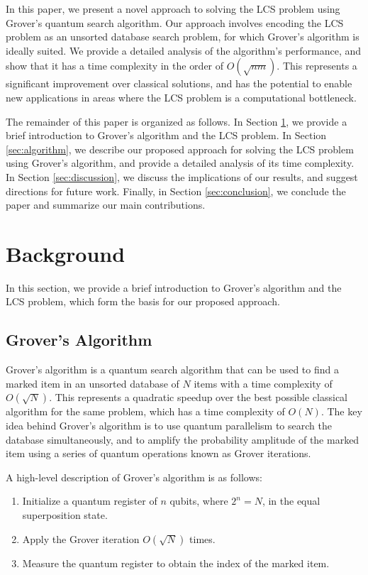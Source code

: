 In this paper, we present a novel approach to solving the LCS problem using Grover's quantum search algorithm. Our approach involves encoding the LCS problem as an unsorted database search problem, for which Grover's algorithm is ideally suited. We provide a detailed analysis of the algorithm's performance, and show that it has a time complexity in the order of $O(\sqrt{nm})$. This represents a significant improvement over classical solutions, and has the potential to enable new applications in areas where the LCS problem is a computational bottleneck.

The remainder of this paper is organized as follows. In Section \ref{sec:background}, we provide a brief introduction to Grover's algorithm and the LCS problem. In Section \ref{sec:algorithm}, we describe our proposed approach for solving the LCS problem using Grover's algorithm, and provide a detailed analysis of its time complexity. In Section \ref{sec:discussion}, we discuss the implications of our results, and suggest directions for future work. Finally, in Section \ref{sec:conclusion}, we conclude the paper and summarize our main contributions.

\section{Background}
\label{sec:background}

In this section, we provide a brief introduction to Grover's algorithm and the LCS problem, which form the basis for our proposed approach.

\subsection{Grover's Algorithm}

Grover's algorithm \cite{grover} is a quantum search algorithm that can be used to find a marked item in an unsorted database of $N$ items with a time complexity of $O(\sqrt{N})$. This represents a quadratic speedup over the best possible classical algorithm for the same problem, which has a time complexity of $O(N)$. The key idea behind Grover's algorithm is to use quantum parallelism to search the database simultaneously, and to amplify the probability amplitude of the marked item using a series of quantum operations known as Grover iterations.

A high-level description of Grover's algorithm is as follows:

\begin{enumerate}
    \item Initialize a quantum register of $n$ qubits, where $2^n = N$, in the equal superposition state.
    \item Apply the Grover iteration $O(\sqrt{N})$ times.
    \item Measure the quantum register to obtain the index of the marked item.
\end{enumerate}


